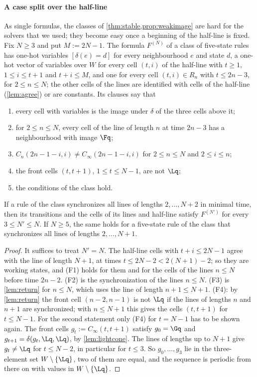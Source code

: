 \paragraph{A case split over the half-line}
As single formulas, the classes of \cref{thm:stable,prop:weakimage} are hard
for the solvers that we used; they become easy once a beginning of the
half-line is fixed. Fix $N\ge3$ and put $M:=2N-1$. The formula $F^{(N)}$ of a
class of five-state rules has one-hot variables $[\delta(e)=d]$ for every
neighbourhood $e$ and state $d$, a one-hot vector of variables over $W$ for
every cell $(t,i)$ of the half-line with $t\ge1$, $1\le i\le t+1$ and
$t+i\le M$, and one for every cell $(t,i)\in R_n$ with $t\le2n-3$, for
$2\le n\le N$; the other cells of the lines are identified with cells of the
half-line (\cref{lem:agree}) or are constants. Its clauses say that
\begin{enumerate}[(F1)]
\item every cell with variables is the image under $\delta$ of the three cells
above it;
\item for $2\le n\le N$, every cell of the line of length $n$ at time $2n-3$ has
a neighbourhood with image $\Fq$;
\item $C_n(2n-1-i,i)\ne C_\infty(2n-1-i,i)$ for $2\le n\le N$ and $2\le i\le n$;
\item the front cells $(t,t+1)$, $1\le t\le N-1$, are not $\Lq$;
\item the conditions of the class hold.
\end{enumerate}

\begin{lemma}\label{lem:Fsound}
If a rule of the class synchronizes all lines of lengths $2,\dots,N+2$ in minimal
time, then its transitions and the cells of its lines and half-line satisfy
$F^{(N')}$ for every $3\le N'\le N$. If $N\ge5$, the same holds for a five-state
rule of the class that synchronizes all lines of lengths $2,\dots,N+1$.
\end{lemma}

\begin{proof}
It suffices to treat $N'=N$. The half-line cells with $t+i\le2N-1$ agree with
the line of length $N+1$, at times $t\le2N-2<2(N+1)-2$; so they are working
states, and (F1) holds for them and for the cells of the lines $n\le N$ before
time $2n-2$. (F2) is the synchronization of the lines $n\le N$. (F3) is
\cref{lem:return} for $n\le N$, which uses the line of length $n+1\le N+1$. (F4):
by \cref{lem:return} the front cell $(n-2,n-1)$ is not $\Lq$ if the lines of
lengths $n$ and $n+1$ are synchronized; with $n\le N+1$ this gives the cells
$(t,t+1)$ for $t\le N-1$. For the second statement only (F4) for $t=N-1$ has to
be shown again. The front cells $g_t:=C_\infty(t,t+1)$ satisfy $g_0=\Gq$ and
$g_{t+1}=\delta(g_t,\Lq,\Lq)$, by \cref{lem:lightcone}. The lines of lengths up to
$N+1$ give $g_t\ne\Lq$ for $t\le N-2$, in particular for $t\le3$. So
$g_0,\dots,g_3$ lie in the three-element set $W\setminus\{\Lq\}$, two of them are
equal, and the sequence is periodic from there on with values in
$W\setminus\{\Lq\}$.
\end{proof}

